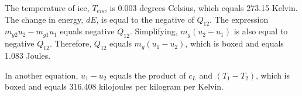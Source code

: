 The temperature of ice, \( T_{eis} \), is 0.003 degrees Celsius, which equals 273.15 Kelvin. The change in energy, \( dE \), is equal to the negative of \( Q_{12} \). The expression \( m_{g2} u_2 - m_{g1} u_1 \) equals negative \( Q_{12} \). Simplifying, \( m_{g} (u_2 - u_1) \) is also equal to negative \( Q_{12} \). Therefore, \( Q_{12} \) equals \( m_{g} (u_1 - u_2) \), which is boxed and equals 1.083 Joules.

In another equation, \( u_1 - u_2 \) equals the product of \( c_{L} \) and \( (T_1 - T_2) \), which is boxed and equals 316.408 kilojoules per kilogram per Kelvin.